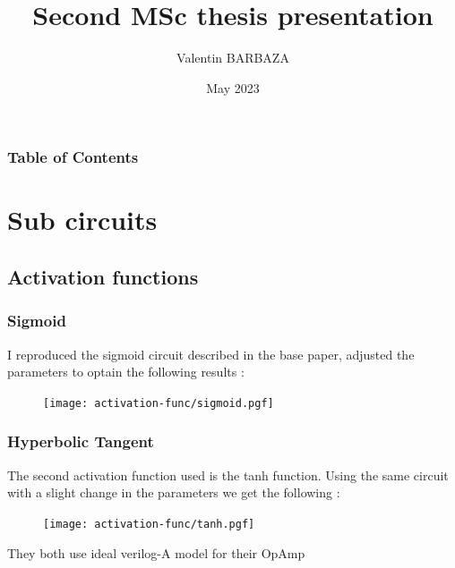\documentclass{beamer}
\title[MSc Thesis 2]
  {Second MSc thesis presentation}
\author[V. BARBAZA]{Valentin BARBAZA}
\date[2023] %
  {May 2023}
\begin{document}
  \frame{\titlepage}

  \begin{frame}
    \frametitle{Table of Contents}
    \tableofcontents
  \end{frame}

  \section{Sub circuits}
  \subsection{Activation functions}

  \begin{frame}
    \frametitle{Sigmoid}
    I reproduced the sigmoid circuit described in the base paper, adjusted the parameters to optain the following results :
    \begin{figure}
      \centering
      \texttt{[image: activation-func/sigmoid.pgf]}
    \end{figure}
  \end{frame}

  \begin{frame}
    \frametitle{Hyperbolic Tangent}
    The second activation function used is the tanh function. Using the same circuit with a slight change in the parameters we get the following :
    \begin{figure}
      \centering
      \texttt{[image: activation-func/tanh.pgf]}
    \end{figure}
    They both use ideal verilog-A model for their OpAmp
  \end{frame}
\end{document}
